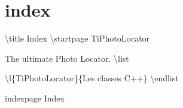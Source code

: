 \chapter{index}
\hypertarget{index}{}\label{index}
\textbackslash{}title Index \textbackslash{}startpage Ti\+Photo\+Locator

The ultimate Photo Locator. \textbackslash{}list \begin{DoxyItemize}
\item \textbackslash{}l\{Ti\+Photo\+Locator\}\{Les classes C++\} \textbackslash{}endlist\end{DoxyItemize}
indexpage Index 
